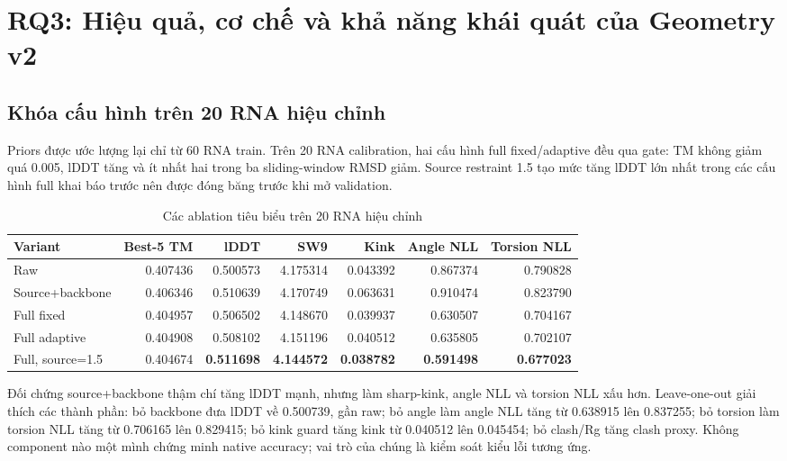 \documentclass[12pt,a4paper,oneside]{report}
\begin{document}
\fi

\section{RQ3: Hiệu quả, cơ chế và khả năng khái quát của Geometry v2}

\subsection{Khóa cấu hình trên 20 RNA hiệu chỉnh}

Priors được ước lượng lại chỉ từ 60 RNA train. Trên 20 RNA calibration, hai cấu hình
full fixed/adaptive đều qua gate: TM không giảm quá 0.005, lDDT tăng và ít nhất hai
trong ba sliding-window RMSD giảm. Source restraint 1.5 tạo mức tăng lDDT lớn nhất trong
các cấu hình full khai báo trước nên được đóng băng trước khi mở validation.

\begin{table}[H]
\centering
\caption{Các ablation tiêu biểu trên 20 RNA hiệu chỉnh}
\small
\begin{tabular}{lrrrrrr}
\toprule
Variant & Best-5 TM & lDDT & SW9 & Kink & Angle NLL & Torsion NLL\\
\midrule
Raw & 0.407436 & 0.500573 & 4.175314 & 0.043392 & 0.867374 & 0.790828\\
Source+backbone & 0.406346 & 0.510639 & 4.170749 & 0.063631 & 0.910474 & 0.823790\\
Full fixed & 0.404957 & 0.506502 & 4.148670 & 0.039937 & 0.630507 & 0.704167\\
Full adaptive & 0.404908 & 0.508102 & 4.151196 & 0.040512 & 0.635805 & 0.702107\\
Full, source=1.5 & 0.404674 & \textbf{0.511698} & \textbf{4.144572} & \textbf{0.038782} & \textbf{0.591498} & \textbf{0.677023}\\
\bottomrule
\end{tabular}
\end{table}

Đối chứng source+backbone thậm chí tăng lDDT mạnh, nhưng làm sharp-kink, angle NLL và
torsion NLL xấu hơn. Leave-one-out giải thích các thành phần: bỏ backbone đưa lDDT về
0.500739, gần raw; bỏ angle làm angle NLL tăng từ 0.638915 lên 0.837255; bỏ torsion làm
torsion NLL tăng từ 0.706165 lên 0.829415; bỏ kink guard tăng kink từ 0.040512 lên
0.045454; bỏ clash/Rg tăng clash proxy. Không component nào một mình chứng minh native
accuracy; vai trò của chúng là kiểm soát kiểu lỗi tương ứng.
\end{document}
